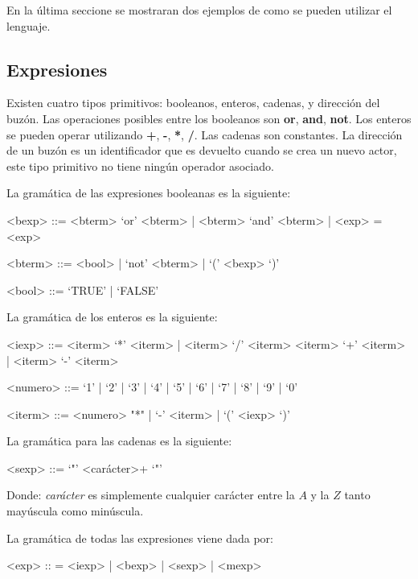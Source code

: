 En la última seccione se mostraran dos ejemplos de como se pueden utilizar el lenguaje.

\subsection{Expresiones}\label{actores:exp}
Existen cuatro tipos primitivos: booleanos, enteros, cadenas, y dirección del buzón. Las operaciones posibles entre los booleanos son \textbf{or}, \textbf{and}, \textbf{not}. Los enteros se pueden operar utilizando \textbf{+}, \textbf{-}, \textbf{*}, \textbf{/}. Las cadenas son constantes. La dirección de un buzón es un identificador que es devuelto cuando se crea un nuevo actor, este tipo primitivo no tiene ningún operador asociado.

La gramática de las expresiones booleanas es la siguiente:

\begin{grammar}

<bexp> ::= <bterm> `or' <bterm> | <bterm> `and' <bterm> | <exp> = <exp>
  
<bterm> ::= <bool> | `not' <bterm> | `(' <bexp> `)' 

<bool> ::= `TRUE' | `FALSE'

\end{grammar}

La gramática de los enteros es la siguiente:

\begin{grammar}

<iexp> ::= <iterm> `*' <iterm> | <iterm> `/' <iterm>  
  \alt <iterm> `+' <iterm>  | <iterm> `-' <iterm>

<numero> ::= `1' | `2' | `3' | `4' | `5' | `6' | `7' | `8' | `9' | `0'

<iterm> ::= <numero> "*" | `-' <iterm> | `(' <iexp> `)'

\end{grammar}

La gramática para las cadenas es la siguiente:

\begin{grammar}
 <sexp> ::= `"' <carácter>+ `"'
\end{grammar}

Donde: \textit{carácter} es simplemente cualquier carácter entre la $A$ y la $Z$ tanto mayúscula como minúscula.

La gramática de todas las expresiones viene dada por:

\begin{grammar}
<exp> :: = <iexp> | <bexp> | <sexp> | <mexp>  
\end{grammar}

